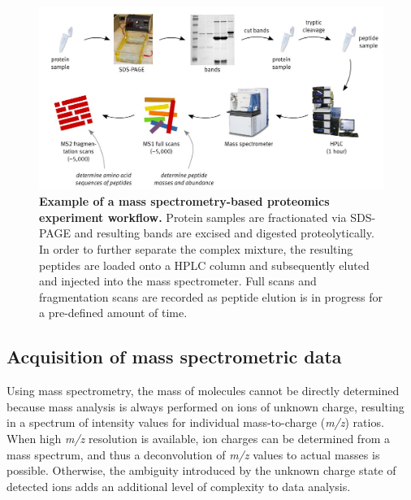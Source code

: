 \begin{figure}
\includegraphics[width=\textwidth]{figures/Proteomics.jpg}
\caption{
{\bf Example of a mass spectrometry-based proteomics experiment workflow.} 
Protein samples are fractionated via SDS-PAGE and resulting bands are excised and
digested proteolytically. In order to further separate the complex mixture, 
the resulting peptides are loaded onto a HPLC column and subsequently eluted 
and injected into the mass spectrometer. Full scans and fragmentation scans
are recorded as peptide elution is in progress for a pre-defined amount of time.
}
\label{fig:proteomics-overview}
\end{figure}

\subsection{Acquisition of mass spectrometric data}

Using mass spectrometry, the mass of molecules cannot be directly determined
because mass analysis is always performed on ions of unknown charge, resulting
in a spectrum of intensity values for individual mass-to-charge ({\em m/z}) 
ratios.
When high {\em m/z} resolution is available, ion charges can be determined 
from a mass spectrum, and thus a deconvolution of {\em m/z} values to actual 
masses is possible.
Otherwise, the ambiguity introduced by the unknown charge state of detected
ions adds an additional level of complexity to data analysis.


